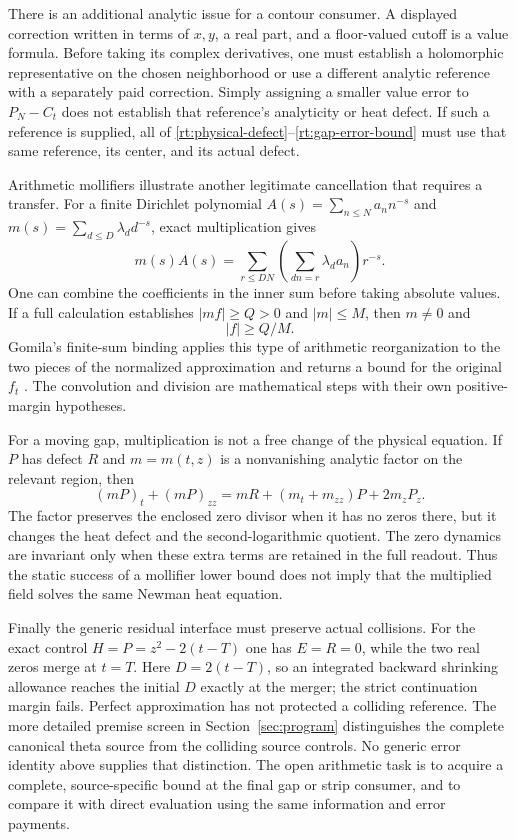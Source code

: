 There is an additional analytic issue for a contour consumer.  A
displayed correction written in terms of $x,y$, a real part, and a
floor-valued cutoff is a value formula.  Before taking its complex
derivatives, one must establish a holomorphic representative on the
chosen neighborhood or use a different analytic reference with a
separately paid correction.  Simply assigning a smaller value error
to $P_N-C_t$ does not establish that reference's analyticity or heat
defect.  If such a reference is supplied, all of
\eqref{rt:physical-defect}--\eqref{rt:gap-error-bound} must use that
same reference, its center, and its actual defect.

Arithmetic mollifiers illustrate another legitimate cancellation that
requires a transfer.  For a finite Dirichlet polynomial
$A(s)=\sum_{n\le N}a_n n^{-s}$ and
$m(s)=\sum_{d\le D}\lambda_d d^{-s}$, exact multiplication gives
\begin{equation}
 m(s)A(s)=\sum_{r\le DN}
           \left(\sum_{dn=r}\lambda_d a_n\right)r^{-s}.
 \label{rt:mollifier-convolution}
\end{equation}
One can combine the coefficients in the inner sum before taking
absolute values.  If a full calculation establishes $|m f|\ge Q>0$
and $|m|\le M$, then $m\ne0$ and
\begin{equation}
 |f|\ge Q/M.
 \label{rt:mollifier-transfer}
\end{equation}
Gomila's finite-sum binding applies this type of arithmetic
reorganization to the two pieces of the normalized approximation and
returns a bound for the original $f_t$
\cite{Gomila2026Binding,VCDCMDiscussion12}.  The convolution and division
are mathematical steps with their own positive-margin hypotheses.

For a moving gap, multiplication is not a free change of the physical
equation.  If $P$ has defect $R$ and $m=m(t,z)$ is a nonvanishing
analytic factor on the relevant region, then
\begin{equation}
 (mP)_t+(mP)_{zz}
      =mR+(m_t+m_{zz})P+2m_zP_z.
 \label{rt:factor-defect}
\end{equation}
The factor preserves the enclosed zero divisor when it has no zeros
there, but it changes the heat defect and the second-logarithmic
quotient.  The zero dynamics are invariant only when these extra terms
are retained in the full readout.  Thus the static success of a
mollifier lower bound does not imply that the multiplied field solves
the same Newman heat equation.

Finally the generic residual interface must preserve actual collisions.
For the exact control $H=P=z^2-2(t-T)$ one has $E=R=0$, while the two
real zeros merge at $t=T$.  Here $D=2(t-T)$, so an integrated backward
shrinking allowance reaches the initial $D$ exactly at the merger;
the strict continuation margin fails.  Perfect approximation has not
protected a colliding reference.  The more detailed premise screen in
Section~\ref{sec:program} distinguishes the complete canonical
theta source from the colliding source controls.  No generic error
identity above supplies that distinction.  The open arithmetic task is
to acquire a complete, source-specific bound at the final gap or strip
consumer, and to compare it with direct evaluation using the same
information and error payments.
